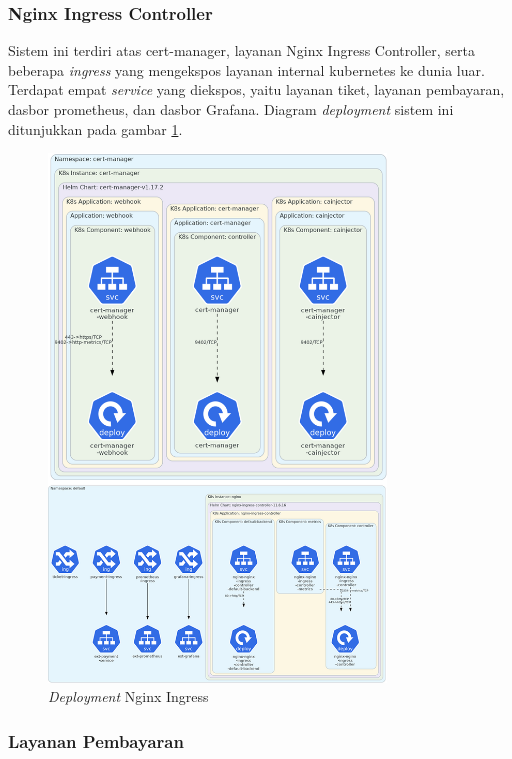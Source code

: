 \subsubsection{Nginx Ingress Controller}

Sistem ini terdiri atas cert-manager, layanan Nginx Ingress Controller, serta beberapa \textit{ingress} yang mengekspos layanan internal kubernetes ke dunia luar. Terdapat empat \textit{service} yang diekspos, yaitu layanan tiket, layanan pembayaran, dasbor prometheus, dan dasbor Grafana. Diagram \textit{deployment} sistem ini ditunjukkan pada gambar \ref{fig:deployment-nginx}.

\begin{figure}[htbp]
    \centering
    \includegraphics[width=0.8\textwidth]{resources/chapter-4/nginx-1.png}
    \caption{\textit{Deployment} Nginx Ingress}
    \label{fig:deployment-nginx}
\end{figure}

\pagebreak

\subsubsection{Layanan Pembayaran}

